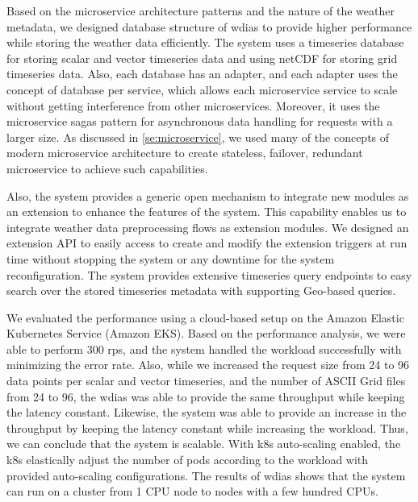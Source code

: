 Based on the microservice architecture patterns and the nature of the weather metadata, we designed database structure of \acrshort{wdias} to provide higher performance while storing the weather data efficiently. The system uses a timeseries database for storing scalar and vector timeseries data and using netCDF for storing grid timeseries data. Also, each database has an adapter, and each adapter uses the concept of database per service, which allows each microservice service to scale without getting interference from other microservices.
Moreover, it uses the microservice sagas pattern for asynchronous data handling for requests with a larger size. As discussed in \cref{se:microservice}, we used many of the concepts of modern microservice architecture to create stateless, failover, redundant microservice to achieve such capabilities.

Also, the system provides a generic open mechanism to integrate new modules as an extension to enhance the features of the system. This capability enables us to integrate weather data preprocessing flows as extension modules.
We designed an extension API to easily access to create and modify the extension triggers at run time without stopping the system or any downtime for the system reconfiguration. The system provides extensive timeseries query endpoints to easy search over the stored timeseries metadata with supporting Geo-based queries.

We evaluated the performance using a cloud-based setup on the Amazon Elastic Kubernetes Service (Amazon EKS).
Based on the performance analysis, we were able to perform 300 \acrshort{rps}, and the system handled the workload successfully with minimizing the error rate. Also, while we increased the request size from 24 to 96 data points per scalar and vector timeseries, and the number of ASCII Grid files from 24 to 96, the \acrshort{wdias} was able to provide the same throughput while keeping the latency constant. Likewise, the system was able to provide an increase in the throughput by keeping the latency constant while increasing the workload. Thus, we can conclude that the system is scalable. With \acrshort{k8s} auto-scaling enabled, the \acrshort{k8s} elastically adjust the number of pods according to the workload with provided auto-scaling configurations. The results of \acrshort{wdias} shows that the system can run on a cluster from 1 CPU node to nodes with a few hundred CPUs.
